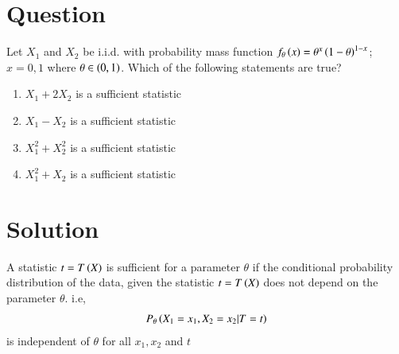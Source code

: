 \documentclass[journal,12pt,twocolumn]{IEEEtran}
\begin{document}
\section*{Question}
Let $X_1$ and $X_2$ be i.i.d. with probability mass function $f_{\theta}\left(x\right) = \theta^x \left(1-\theta\right)^{1-x}$; $x=0,1$ where $\theta \in \left(0,1\right)$. Which of the following statements are true?
\begin{enumerate}
    \item $X_1 + 2X_2 $ is a sufficient statistic
    \item $X_1 - X_2 $ is a sufficient statistic
    \item $X_1^2 + X_2^2 $ is a sufficient statistic
    \item $X_1^2 + X_2 $ is a sufficient statistic
\end{enumerate}
\section*{Solution}
A statistic $t=T\left(X\right)$ is sufficient for a parameter $\theta$ if the conditional probability distribution of the data, given the statistic $t=T\left(X\right)$ does not depend on the parameter $\theta$. i.e,
\begin{align}
    P_\theta\left(X_1=x_1,X_2=x_2|T=t\right)
\end{align}
is independent of $\theta$ for all $x_1,x_2$ and $t$
\end{document}

